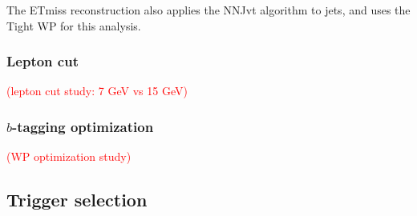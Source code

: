\documentclass[../thesis.tex]{subfiles}
\begin{document}
The \acs{ETmiss} reconstruction also applies the NNJvt algorithm to jets, and uses the Tight WP for this analysis.\\

\subsubsection*{Lepton \pT cut}
\label{sec:lepptcut}
\textcolor{red}{(lepton \pT cut study: 7 GeV vs 15 GeV)}

\subsubsection*{$b$-tagging optimization}
\label{sec:btagopt}
\textcolor{red}{(WP optimization study)}


\subsection{Trigger selection}
\label{sec:trigsec}
\end{document}
